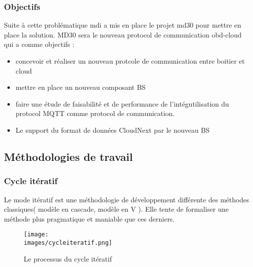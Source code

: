          \subsubsection{Objectifs}
           Suite à cette problématique \gls{mdi} a mis en place le projet \gls{md30} pour mettre en place la solution.
           MD30 sera le nouveau protocol de communication \gls{obd}-cloud qui a comme objectifs :
            \begin{itemize}
                \renewcommand{\labelitemi}{$\bullet$}
                \item concevoir et réaliser un nouveau protcole de communication entre boitier et cloud
                \item mettre en place un nouveau composant \gls{BS}
                \item faire une étude de faisabilité et de performance de l'intégutilisation du protocol MQTT 
                comme protocol de communication.
                \item Le support du format de données CloudNext par le nouveau BS
            \end{itemize} 

    \subsection{Méthodologies de travail}
        \subsubsection{Cycle itératif }
            Le mode itératif est une méthodologie de développement différente des méthodes classiques( modèle en cascade, modèle en V ).
            Elle tente de formaliser une méthode plus pragmatique et maniable que ces derniers. 
            \begin{figure}[ht]
                \centering
                \texttt{[image: \\images/cycleiteratif.png]}
                \caption{Le processus du cycle itératif}
            \end{figure}
           
            \vspace{0.2cm}

